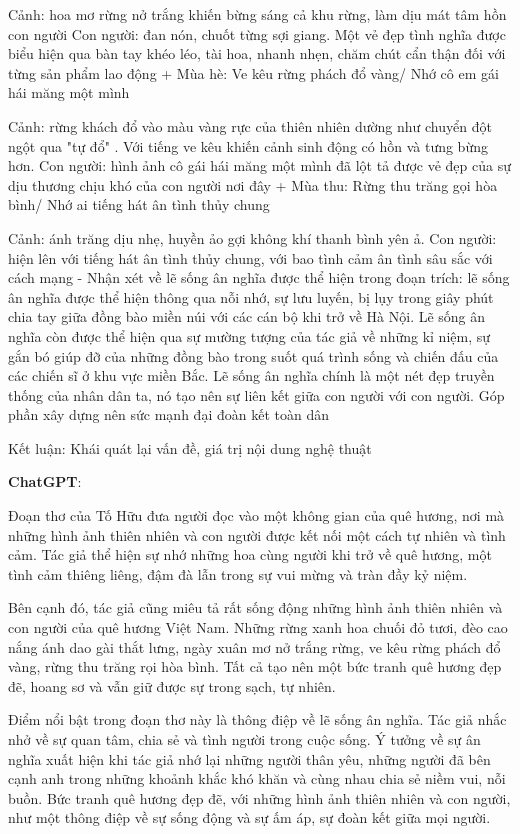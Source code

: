 \documentclass{article}
\begin{document}
{\begin{mdframed}[linewidth=1pt,linecolor=red]
		Cảnh: hoa mơ rừng nở trắng khiến bừng sáng cả khu rừng, làm dịu mát tâm hồn con người
		Con người: đan nón, chuốt từng sợi giang. Một vẻ đẹp tình nghĩa được biểu hiện qua bàn tay khéo léo, tài hoa, nhanh nhẹn, chăm chút cẩn thận đối với từng sản phẩm lao động
		+ Mùa hè: Ve kêu rừng phách đổ vàng/ Nhớ cô em gái hái măng một mình
		
		Cảnh: rừng khách đổ vào màu vàng rực của thiên nhiên dường như chuyển đột ngột qua "tự đổ" . Với tiếng ve kêu khiến cảnh sinh động có hồn và tưng bừng hơn.
		Con người: hình ảnh cô gái hái măng một mình đã lột tả được vẻ đẹp của sự dịu thương chịu khó của con người nơi đây
		+ Mùa thu: Rừng thu trăng gọi hòa bình/ Nhớ ai tiếng hát ân tình thủy chung
		
		Cảnh: ánh trăng dịu nhẹ, huyền ảo gợi không khí thanh bình yên ả.
		Con người: hiện lên với tiếng hát ân tình thủy chung, với bao tình cảm ân tình sâu sắc với cách mạng
		- Nhận xét về lẽ sống ân nghĩa được thể hiện trong đoạn trích: lẽ sống ân nghĩa được thể hiện thông qua nỗi nhớ, sự lưu luyến, bị lụy trong giây phút chia tay giữa đồng bào miền núi với các cán bộ khi trở về Hà Nội. Lẽ sống ân nghĩa còn được thể hiện qua sự mường tượng của tác giả về những kỉ niệm, sự gắn bó giúp đỡ của những đồng bào trong suốt quá trình sống và chiến đấu của các chiến sĩ ở khu vực miền Bắc. Lẽ sống ân nghĩa chính là một nét đẹp truyền thống của nhân dân ta, nó tạo nên sự liên kết giữa con người với con người. Góp phần xây dựng nên sức mạnh đại đoàn kết toàn dân
		
		Kết luận: Khái quát lại vấn đề, giá trị nội dung nghệ thuật
		
		\textbf{ChatGPT}:
		
		Đoạn thơ của Tố Hữu đưa người đọc vào một không gian của quê hương, nơi mà những hình ảnh thiên nhiên và con người được kết nối một cách tự nhiên và tình cảm. Tác giả thể hiện sự nhớ những hoa cùng người khi trở về quê hương, một tình cảm thiêng liêng, đậm đà lẫn trong sự vui mừng và tràn đầy kỷ niệm.
		
		Bên cạnh đó, tác giả cũng miêu tả rất sống động những hình ảnh thiên nhiên và con người của quê hương Việt Nam. Những rừng xanh hoa chuối đỏ tươi, đèo cao nắng ánh dao gài thắt lưng, ngày xuân mơ nở trắng rừng, ve kêu rừng phách đổ vàng, rừng thu trăng rọi hòa bình. Tất cả tạo nên một bức tranh quê hương đẹp đẽ, hoang sơ và vẫn giữ được sự trong sạch, tự nhiên.
		
		Điểm nổi bật trong đoạn thơ này là thông điệp về lẽ sống ân nghĩa. Tác giả nhắc nhở về sự quan tâm, chia sẻ và tình người trong cuộc sống. Ý tưởng về sự ân nghĩa xuất hiện khi tác giả nhớ lại những người thân yêu, những người đã bên cạnh anh trong những khoảnh khắc khó khăn và cùng nhau chia sẻ niềm vui, nỗi buồn. Bức tranh quê hương đẹp đẽ, với những hình ảnh thiên nhiên và con người, như một thông điệp về sự sống động và sự ấm áp, sự đoàn kết giữa mọi người.
		

\end{mdframed}}
\end{document}
